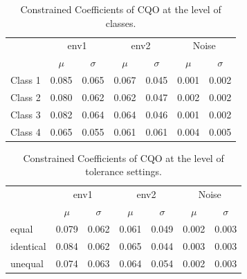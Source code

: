 			\begin{table}[h!] 
				
				\normalsize
				\caption{Constrained Coefficients of CQO at the level of classes.}
				\centering
				
				\begin{tabular}{@{}lcccccc@{}}
					\toprule
					& \multicolumn{2}{c}{env1} & \multicolumn{2}{c}{env2} & \multicolumn{2}{c}{Noise}\\\cmidrule(l){2-3} \cmidrule(l){4-5} \cmidrule(l){6-7}
					& $\mu$ & $\sigma$ & $\mu$ & $\sigma$ & $\mu$ & $\sigma$\\
					\hline
					Class 1 & 0.085 & 0.065 & 0.067 & 0.045 & 0.001 & 0.002 \\
					Class 2 & 0.080 & 0.062 & 0.062 & 0.047 & 0.002 & 0.002 \\
					Class 3 & 0.082 & 0.064 & 0.064 & 0.046 & 0.001 & 0.002 \\
					Class 4 & 0.065 & 0.055 & 0.061 & 0.061 & 0.004 & 0.005 \\
					\toprule
				\end{tabular}
			
				\label{tab:cqosm2}
			
			\end{table}
		
			\begin{table}[h!] 
				
				\normalsize
				\caption{Constrained Coefficients of CQO at the level of tolerance settings.}
				\centering
				
				\begin{tabular}{@{}lcccccc@{}}
					
					\toprule
					& \multicolumn{2}{c}{env1} & \multicolumn{2}{c}{env2} & \multicolumn{2}{c}{Noise}\\\cmidrule(l){2-3} \cmidrule(l){4-5} \cmidrule(l){6-7}
					& $\mu$ & $\sigma$ & $\mu$ & $\sigma$ & $\mu$ & $\sigma$\\
					\hline
					equal & 0.079 & 0.062 & 0.061 & 0.049 & 0.002 & 0.003 \\
					identical & 0.084 & 0.062 & 0.065 & 0.044 & 0.003 & 0.003 \\
					unequal & 0.074 & 0.063 & 0.064 & 0.054 & 0.002 & 0.003 \\
					\toprule
				\end{tabular}
			
				\label{tab:cqosm3}
			
			\end{table}
		
